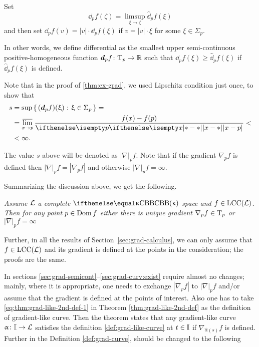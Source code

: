 Set 
\[\dd_pf(\zeta)=\limsup_{\xi\to\zeta}\hat\dd_pf(\xi)\]
and then set $\dd_pf(v)=|v|\cdot \dd_pf(\xi)$ if $v=|v|\cdot\xi$ for some $\xi\in\Sigma_p$.

In other words, we define differential as the smallest 
upper semi-continuous  positive-homogeneous function $\dd_pf\:\T_p\to\RR$
such that $\dd_pf(\xi)\ge \hat \dd_pf(\xi)$ if $\hat\dd_pf(\xi)$ is defined.



Note that in the proof of \ref{thm:ex-grad}, 
we used Lipschitz condition just once,
to show that 
\begin{align*}
s&=\sup\set{(\dd_p f)(\xi)}{\xi\in\Sigma_p}=
\\
&=\limsup_{x\to p}\frac{f(x)-f(p)}{\dist{x}{p}{}}<
\\
&<\infty.
\end{align*}


The value $s$ above will be denoted as $|\nabla|_pf$.
Note that 
if the gradient $\nabla_pf$ is defined then $|\nabla|_pf=|\nabla_pf|$
and otherwise $|\nabla|_pf=\infty$.

Summarizing the discussion above, 
we get the following.

\textit{Assume $\mathcal{L}$ a complete $\Alex\kappa$ space and $f\in \LSCSC(\spc{L})$. 
Then for any point $p\in \Dom f$ either there is unique gradient $\nabla_p f\in \T_p$ 
or $|\nabla|_pf=\infty$}

\medskip

Further, in all the results of Section~\ref{sec:grad-calculus}, 
we can only assume that $f\in \LSCSC(\spc{L})$ and its gradient is defined at the points in the consideration; 
the proofs are the same.

In sections \ref{sec:grad-semicont}--\ref{sec:grad-curv:exist}
require almost no changes;
mainly, where it is appropriate,
one needs to exchange $|\nabla_p f|$ 
to $|\nabla|_pf$ 
and/or assume that the gradient is defined at the points of interest.
Also one has to take \ref{eq:thm:grad-like-2nd-def-1} in Theorem \ref{thm:grad-like-2nd-def}
as the definition of gradient-like curve.
Then the theorem states that any  gradient-like curve $\alpha\:\II\to\spc{L}$ satisfies the definition \ref{def:grad-like-curve} at $t\in \II$ if $\nabla_{\hat\alpha(s)} f$ is defined.
Further in the Definition \ref{def:grad-curve}, should be changed to the following

\medskip

